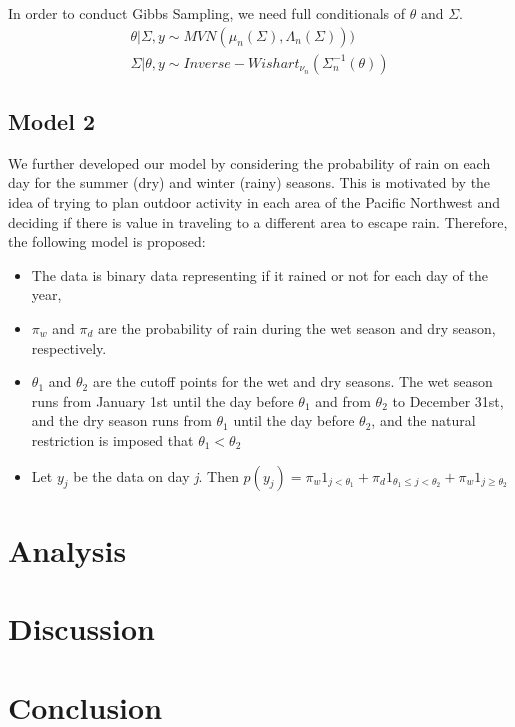 \documentclass{article}
\begin{document}
In order to conduct Gibbs Sampling, we need full conditionals of $\theta$ and $\Sigma$. 
\begin{align*}
\theta | \Sigma, y \sim MVN(\mu_n(\Sigma), \Lambda_n(\Sigma)))  \\
\Sigma | \theta, y \sim Inverse - Wishart_{\nu_n} (\Sigma_n^{-1}(\theta))
\end{align*}


\subsection{Model 2}

We further developed our model by considering the probability of rain on each day for the summer (dry) and winter (rainy) seasons. This is motivated by the idea of trying to plan outdoor activity in each area of the Pacific Northwest and deciding if there is value in traveling to a different area to escape rain.
Therefore, the following model is proposed:
\begin{itemize}
\item The data is binary data representing if it rained or not for each day of the year,
\item $\pi_w$ and $\pi_d$ are the probability of rain during the wet season and dry season, respectively.
\item $\theta_1$ and $\theta_2$ are the cutoff points for the wet and dry seasons. The wet season runs from January 1st until the day before $\theta_1$ and from $\theta_2$ to December 31st, and the dry season runs from $\theta_1$ until the day before $\theta_2$, and the natural restriction is imposed that $\theta_1 < \theta_2$
\item Let $y_j$ be the data on day \textit{j}. Then $p(y_j) = \pi_w  1_{j < \theta_1} + \pi_d  1_{\theta_1\leq j < \theta_2} +\pi_w  1_{j \geq \theta_2} $
\end{itemize}

\section{Analysis}

\section{Discussion}

\section{Conclusion}
\end{document}
